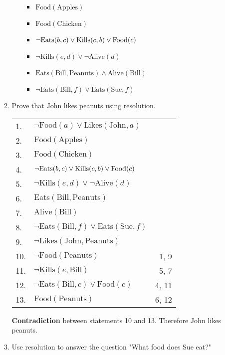 \documentclass[12pt]{article}
\begin{document}
\begin{enumerate}
\begin{enumerate}
\begin{enumerate}[label=\arabic*.]
\begin{itemize}
						\item $\text{Food}(\text{Apples})$
						\item $\text{Food}(\text{Chicken})$
						\item $\neg \text{Eats}(b, c) \lor  \text{\text{Kills}}(c, b) \lor \text{Food}(c)$
						\item $\neg \text{Kills}(e, d) \lor \neg \text{Alive}(d)$
						\item $\text{Eats}(\text{Bill}, \text{Peanuts}) \land \text{Alive}(\text{Bill})$
						\item $\neg \text{Eats}(\text{Bill}, f) \lor \text{Eats}(\text{Sue}, f)$
					\end{itemize}
			\end{enumerate}

			\item Prove that John likes peanuts using resolution.

				\begin{tabular}{ l l r }
					1. & $\neg \text{Food}(a) \lor \text{Likes}(\text{John}, a)$ & \\
					2. & $\text{Food}(\text{Apples})$ & \\
					3. & $\text{Food}(\text{Chicken})$ & \\
					4. & $\neg \text{Eats}(b, c) \lor  \text{\text{Kills}}(c, b) \lor \text{Food}(c)$ & \\
					5. & $\neg \text{Kills}(e, d) \lor \neg \text{Alive}(d)$ & \\
					6. & $\text{Eats}(\text{Bill}, \text{Peanuts})$ & \\
					7. & $\text{Alive}(\text{Bill})$ & \\
					8. & $\neg \text{Eats}(\text{Bill}, f) \lor \text{Eats}(\text{Sue}, f)$ & \\
					9. & $\neg \text{Likes}(\text{John}, \text{Peanuts})$ & \\
					\toprule
					10. & $\neg \text{Food}(\text{Peanuts})$ & 1, 9 \\
					11. & $\neg \text{Kills}(e, \text{Bill})$ & 5, 7 \\
					12. & $\neg \text{Eats}(\text{Bill}, c) \lor \text{Food}(c)$ & 4, 11 \\
					13. & $\text{Food}(\text{Peanuts})$ & 6, 12 \\
				\end{tabular}

				\textbf{Contradiction} between statements 10 and 13. Therefore John likes peanuts.

			\item Use resolution to answer the question "What food does Sue eat?"


\end{enumerate}
\end{enumerate}
\end{document}

